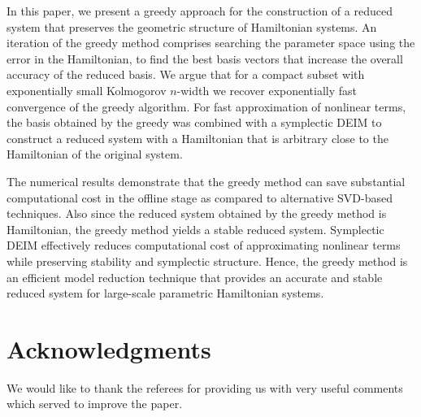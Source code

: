 In this paper, we present a greedy approach for the construction of a reduced system that preserves the geometric structure of Hamiltonian systems. An iteration of the greedy method comprises searching the parameter space using the error in the Hamiltonian, to find the best basis vectors that increase the overall accuracy of the reduced basis. We argue that for a compact subset with exponentially small Kolmogorov $n$-width we recover exponentially fast convergence of the greedy algorithm. For fast approximation of nonlinear terms, the basis obtained by the greedy was combined with a symplectic DEIM to construct a reduced system with a Hamiltonian that is arbitrary close to the Hamiltonian of the original system.

The numerical results demonstrate that the greedy method can save substantial computational cost in the offline stage as compared to alternative SVD-based techniques. Also since the reduced system obtained by the greedy method is Hamiltonian, the greedy method yields a stable reduced system. Symplectic DEIM effectively reduces computational cost of approximating nonlinear terms while preserving stability and symplectic structure. Hence, the greedy method is an efficient model reduction technique that provides an accurate and stable reduced system for large-scale parametric Hamiltonian systems.

\section*{Acknowledgments}
We would like to thank the referees for providing us with very useful comments which served to improve the paper.


